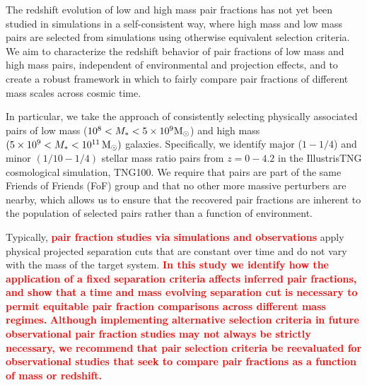 \documentclass[linenumbers,twocolumn]{aastex631}
\newcommand{\add}[1]{\textcolor{red}{\textbf{#1}}}
\begin{document}
    The redshift evolution of low and high mass pair fractions has not yet been studied in simulations in a self-consistent way, where high mass and low mass pairs are selected from simulations using otherwise equivalent selection criteria. 
    We aim to characterize the redshift behavior of pair fractions of low mass and high mass pairs, independent of environmental and projection effects, and to create a robust framework in which to fairly compare pair fractions of different mass scales across cosmic time. 

    In particular, we take the approach of consistently selecting physically associated pairs of low mass ($10^8<M_*<5\times10^9\mathrm{M}_\odot$) and high mass $(5\times10^9<M_*<10^{11}\,\mathrm{M}_\odot)$ galaxies. 
    Specifically, we identify major ($1-1/4$) and minor $(1/10-1/4)$ stellar mass ratio pairs from $z=0-4.2$ in the IllustrisTNG cosmological simulation, TNG100. 
    We require that pairs are part of the same Friends of Friends (FoF) group and that no other more massive perturbers are nearby, which allows us to ensure that the recovered pair fractions are inherent to the population of selected pairs rather than a function of environment. 

    Typically, 
    \add{pair fraction studies via simulations and observations}
    apply physical projected separation cuts that are constant over time and do not vary with the mass of the target system. 
    \add{In this study we identify how the application of a fixed separation criteria affects inferred pair fractions, and show that a time and mass evolving separation cut is necessary to permit equitable pair fraction comparisons across different mass regimes.} 
    \add{Although implementing alternative selection criteria in future observational pair fraction studies may not always be strictly necessary, we recommend that pair selection criteria be reevaluated for observational studies that seek to compare pair fractions as a function of mass or redshift.}
\end{document}
